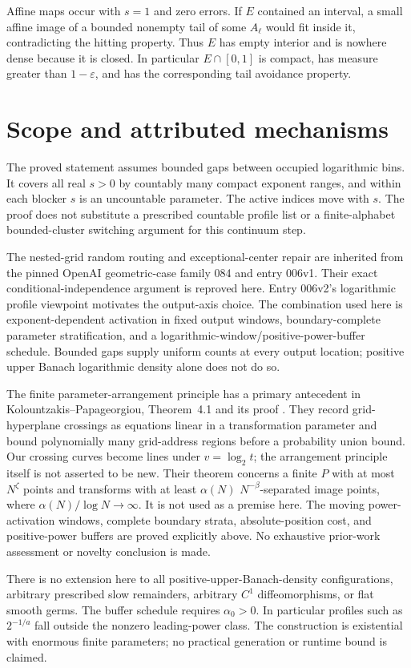 \documentclass[11pt,letterpaper]{article}
\newcommand{\logtwo}{\log_2}
\begin{document}
Affine maps occur with $s=1$ and zero errors. If $E$ contained an interval, a
small affine image of a bounded nonempty tail of some $A_\ell$ would fit inside
it, contradicting the hitting property. Thus $E$ has empty interior and is
nowhere dense because it is closed. In particular $E\cap[0,1]$ is compact,
has measure greater than $1-\varepsilon$, and has the corresponding tail
avoidance property.

\section{Scope and attributed mechanisms}
The proved statement assumes bounded gaps between occupied logarithmic bins.
It covers all real $s>0$ by countably many compact exponent ranges, and within
each blocker $s$ is an uncountable parameter. The active indices move with $s$.
The proof does not substitute a prescribed countable profile list or a
finite-alphabet bounded-cluster switching argument for this continuum step.

The nested-grid random routing and exceptional-center repair are inherited
from the pinned OpenAI geometric-case family 084 and entry 006v1. Their exact
conditional-independence argument is reproved here. Entry 006v2's logarithmic
profile viewpoint motivates the output-axis choice. The combination used here
is exponent-dependent activation in fixed output windows, boundary-complete
parameter stratification, and a logarithmic-window/positive-power-buffer
schedule. Bounded gaps supply uniform counts at every output location; positive
upper Banach logarithmic density alone does not do so.

The finite parameter-arrangement principle has a primary antecedent in
Kolountzakis--Papageorgiou, Theorem~4.1 and its proof \cite{KP}. They record
grid-hyperplane crossings as equations linear in a transformation parameter
and bound polynomially many grid-address regions before a probability union
bound. Our crossing curves become lines under $v=\logtwo t$; the arrangement
principle itself is not asserted to be new. Their theorem concerns a finite
$P$ with at most $N^\zeta$ points and transforms with at least $\alpha(N)$
$N^{-\beta}$-separated image points, where $\alpha(N)/\log N\to\infty$.
It is not used as a premise here. The moving power-activation windows, complete
boundary strata, absolute-position cost, and positive-power buffers are
proved explicitly above. No exhaustive prior-work assessment or novelty
conclusion is made.

There is no extension here to all positive-upper-Banach-density configurations,
arbitrary prescribed slow remainders, arbitrary $C^1$ diffeomorphisms, or flat
smooth germs. The buffer schedule requires $\alpha_0>0$. In particular profiles
such as $2^{-1/a}$ fall outside the nonzero leading-power class. The construction
is existential with enormous finite parameters; no practical generation or
runtime bound is claimed.
\end{document}
